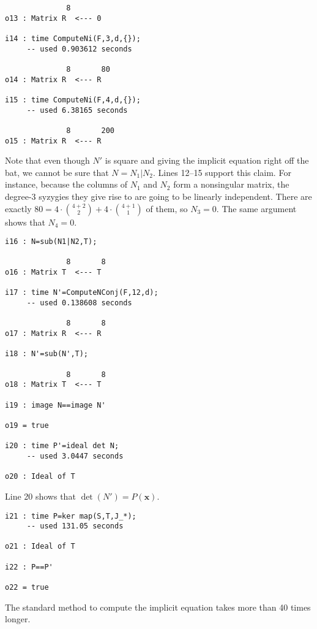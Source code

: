 \documentclass[fleqn,reqno]{amsart}
\begin{document}
\begin{example}[$\mt{ex601}$]
\begin{verbatim}
              8
o13 : Matrix R  <--- 0

i14 : time ComputeNi(F,3,d,{});
     -- used 0.903612 seconds

              8       80
o14 : Matrix R  <--- R

i15 : time ComputeNi(F,4,d,{});
     -- used 6.38165 seconds

              8       200
o15 : Matrix R  <--- R
\end{verbatim}
Note that even though $N'$ is square and giving the implicit equation right off the bat,
we cannot be sure that $N=N_1|N_2$.
Lines 12--15 support this claim.
For instance, because the columns of $N_1$ and $N_2$ form a nonsingular matrix,
the degree-$3$ syzygies they give rise to are going to be linearly independent.
There are exactly $80=4\cdot\binom{4+2}{2}+4\cdot\binom{4+1}{1}$ of them, so $N_3=0$.
The same argument shows that $N_4=0$.

\begin{verbatim}
i16 : N=sub(N1|N2,T);

              8       8
o16 : Matrix T  <--- T

i17 : time N'=ComputeNConj(F,12,d);
     -- used 0.138608 seconds

              8       8
o17 : Matrix R  <--- R

i18 : N'=sub(N',T);

              8       8
o18 : Matrix T  <--- T

i19 : image N==image N'

o19 = true

i20 : time P'=ideal det N;
     -- used 3.0447 seconds

o20 : Ideal of T
\end{verbatim}
Line 20 shows that $\det(N')=P(\mathbf x)$.
\begin{verbatim}
i21 : time P=ker map(S,T,J_*);
     -- used 131.05 seconds

o21 : Ideal of T

i22 : P==P'

o22 = true
\end{verbatim}
The standard method to compute the implicit equation takes more than 40 times longer.
\end{example}
\end{document}
